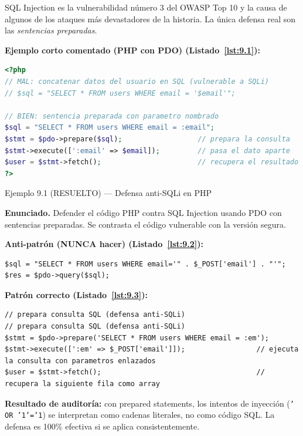 \documentclass[11pt,a4paper,openany]{book}
\begin{document}
SQL Injection es la vulnerabilidad número 3 del OWASP Top 10
y la causa de algunos de los ataques más devastadores de la
historia. La única defensa real son las \emph{sentencias preparadas}.

\textbf{Ejemplo corto comentado (PHP con PDO) (Listado~\ref{lst:9.1}):}
\begin{lstlisting}[language=PHP,numbers=none,caption={Ejemplo de PHP},label=lst:9.1]
<?php
// MAL: concatenar datos del usuario en SQL (vulnerable a SQLi)
// $sql = "SELECT * FROM users WHERE email = '$email'";

// BIEN: sentencia preparada con parametro nombrado
$sql = "SELECT * FROM users WHERE email = :email";
$stmt = $pdo->prepare($sql);                  // prepara la consulta
$stmt->execute([':email' => $email]);         // pasa el dato aparte
$user = $stmt->fetch();                       // recupera el resultado
?>
\end{lstlisting}


\begin{cajaejemplo}{Ejemplo 9.1 (RESUELTO) --- Defensa anti-SQLi en PHP}


\textbf{Enunciado.} Defender el código PHP contra SQL Injection usando PDO con sentencias preparadas. Se contrasta el código vulnerable con la versión segura.

\textbf{Anti-patrón (NUNCA hacer) (Listado~\ref{lst:9.2}):}
\begin{lstlisting}[style=php,numbers=none,caption={Ejemplo de PHP},label=lst:9.2]
$sql = "SELECT * FROM users WHERE email='" . $_POST['email'] . "'";
$res = $pdo->query($sql);
\end{lstlisting}

\textbf{Patrón correcto (Listado~\ref{lst:9.3}):}
\begin{lstlisting}[style=php,numbers=none,caption={Ejemplo de PHP},label=lst:9.3]
// prepara consulta SQL (defensa anti-SQLi)
// prepara consulta SQL (defensa anti-SQLi)
$stmt = $pdo->prepare('SELECT * FROM users WHERE email = :em');
$stmt->execute([':em' => $_POST['email']]);                 // ejecuta la consulta con parametros enlazados
$user = $stmt->fetch();                                     // recupera la siguiente fila como array
\end{lstlisting}

\textbf{Resultado de auditoría:} con prepared statements, los intentos
de inyección (\texttt{' OR '1'='1}) se interpretan como cadenas
literales, no como código SQL. La defensa es 100\% efectiva si se
aplica consistentemente.
\end{cajaejemplo}
\end{document}
